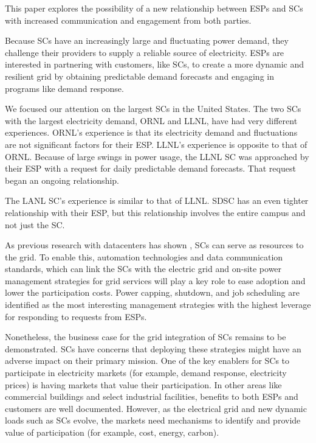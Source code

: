 This paper explores the possibility of a new relationship between ESPs
and SCs with increased communication and engagement from both parties.

Because SCs have an increasingly large and fluctuating
power demand, they challenge their providers to supply a reliable
source of electricity.
ESPs are interested in partnering with customers,
like SCs, to create a more dynamic and resilient grid
by obtaining predictable demand forecasts and engaging in programs like 
demand response.

We focused our attention on the largest SCs in the United States. The two SCs with the largest electricity demand, ORNL and LLNL, have had very different experiences. 
ORNL's experience is that its electricity demand and fluctuations are not significant factors for their 
ESP. 
LLNL's experience is opposite to that of ORNL. Because of large swings in 
power usage, the LLNL SC was approached by their ESP with a 
request for daily predictable demand forecasts. That request began an ongoing relationship. 

The LANL SC's experience is similar to that of LLNL. SDSC has an even tighter relationship 
with their ESP, but this relationship involves the entire campus and not just the 
SC. 

As previous research with datacenters has shown \cite{LBNL-6560E}, SCs can serve as  
resources to the grid. To enable this, automation technologies and data communication standards, 
which can link the SCs with the electric grid and on-site power management strategies 
for grid services will play a key role to ease adoption and lower the participation costs. Power capping, 
shutdown, and job scheduling are identified as the most interesting management strategies with the highest 
leverage for responding to requests from ESPs. 

Nonetheless, the business case for the grid integration of SCs remains to be demonstrated. 
SCs have concerns that deploying these strategies might have an adverse impact on 
their primary mission. One of the key enablers for SCs to participate in 
electricity markets (for example, demand response, electricity prices) is having markets that value their 
participation. In other areas like commercial buildings and select industrial facilities, benefits to 
both ESPs and customers are well documented. However, as the electrical grid 
and new dynamic loads such as SCs evolve, the markets need mechanisms to identify 
and provide value of participation (for example, cost, energy, carbon).

